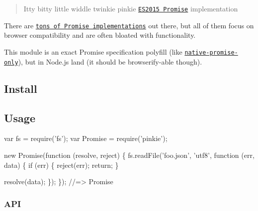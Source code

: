\section*{~\newline
  ~\newline
 ~\newline
 }

\begin{quote}
Itty bitty little widdle twinkie pinkie \href{https://people.mozilla.org/~jorendorff/es6-draft.html#sec-promise-objects}{\tt E\+S2015 Promise} implementation \end{quote}


\href{https://travis-ci.org/floatdrop/pinkie}{\tt } \href{https://coveralls.io/github/floatdrop/pinkie?branch=master}{\tt }

There are \href{https://github.com/promises-aplus/promises-spec/blob/master/implementations.md#standalone}{\tt tons of Promise implementations} out there, but all of them focus on browser compatibility and are often bloated with functionality.

This module is an exact Promise specification polyfill (like \href{https://github.com/getify/native-promise-only}{\tt native-\/promise-\/only}), but in Node.\+js land (it should be browserify-\/able though).

\subsection*{Install}




\subsection*{Usage}


\begin{DoxyCode}
var fs = require('fs');
var Promise = require('pinkie');

new Promise(function (resolve, reject) \{
    fs.readFile('foo.json', 'utf8', function (err, data) \{
        if (err) \{
            reject(err);
            return;
        \}

        resolve(data);
    \});
\});
//=> Promise
\end{DoxyCode}


\subsubsection*{A\+PI}

